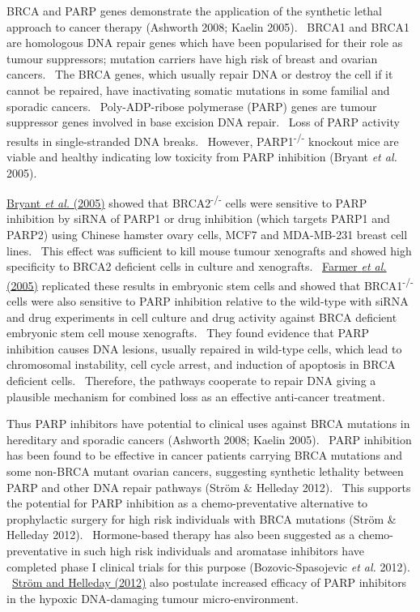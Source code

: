 BRCA and PARP genes demonstrate the application of the synthetic lethal approach to cancer therapy (Ashworth 2008; Kaelin 2005). \ BRCA1 and BRCA1 are homologous DNA repair genes which have been popularised for their role as tumour suppressors; mutation carriers have high risk of breast and ovarian cancers. \ The BRCA genes, which usually repair DNA or destroy the cell if it cannot be repaired, have inactivating somatic mutations in some familial and sporadic cancers. \ Poly-ADP-ribose polymerase (PARP) genes are tumour suppressor genes involved in base excision DNA repair. \ Loss of PARP activity results in single-stranded DNA breaks. \ However, PARP1\textsuperscript{{}-/-}\textsubscript{ }knockout mice are viable and healthy indicating low toxicity from PARP inhibition (Bryant\textit{ et al.} 2005). \  

\hyperlink{ENREF19}{Bryant}\hyperlink{ENREF19}{\textit{ et al.}}\hyperlink{ENREF19}{ (2005)} showed that BRCA2\textsuperscript{{}-/-} cells were sensitive to PARP inhibition by siRNA of PARP1 or drug inhibition (which targets PARP1 and PARP2) using Chinese hamster ovary cells, MCF7 and MDA-MB-231 breast cell lines. \ This effect was sufficient to kill mouse tumour xenografts and showed high specificity to BRCA2 deficient cells in culture and xenografts. \ \hyperlink{ENREF39}{Farmer}\hyperlink{ENREF39}{\textit{ et al.}}\hyperlink{ENREF39}{ (2005)} replicated these results in embryonic stem cells and showed that BRCA1\textsuperscript{{}-/-} cells were also sensitive to PARP inhibition relative to the wild-type with siRNA and drug experiments in cell culture and drug activity against BRCA deficient embryonic stem cell mouse xenografts. \ They found evidence that PARP inhibition causes DNA lesions, usually repaired in wild-type cells, which lead to chromosomal instability, cell cycle arrest, and induction of apoptosis in BRCA deficient cells. \ Therefore, the pathways cooperate to repair DNA giving a plausible mechanism for combined loss as an effective anti-cancer treatment. \  

Thus PARP inhibitors have potential to clinical uses against BRCA mutations in hereditary and sporadic cancers (Ashworth 2008; Kaelin 2005). \ PARP inhibition has been found to be effective in cancer patients carrying BRCA mutations and some non-BRCA mutant ovarian cancers, suggesting synthetic lethality between PARP and other DNA repair pathways (Str\"om \& Helleday 2012). \ This supports the potential for PARP inhibition as a chemo-preventative alternative to prophylactic surgery for high risk individuals with BRCA mutations (Str\"om \& Helleday 2012). \ Hormone-based therapy has also been suggested as a chemo-preventative in such high risk individuals and aromatase inhibitors have completed phase I clinical trials for this purpose (Bozovic-Spasojevic\textit{ et al.} 2012). \ \hyperlink{ENREF91}{Str\"om and Helleday (2012)} also postulate increased efficacy of PARP inhibitors in the hypoxic DNA-damaging tumour micro-environment. \  

